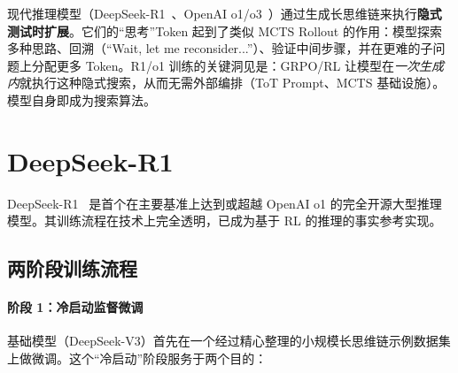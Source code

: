 \begin{intuitionbox}[推理模型中的隐式测试时扩展]
现代推理模型（DeepSeek-R1~\cite{deepseek2025r1}、OpenAI o1/o3~\cite{openai2024o1, openai2025o3}）通过生成长思维链来执行\textbf{隐式测试时扩展}。它们的“思考”Token 起到了类似 MCTS Rollout 的作用：模型探索多种思路、回溯（“Wait, let me reconsider...”）、验证中间步骤，并在更难的子问题上分配更多 Token。R1/o1 训练的关键洞见是：GRPO/RL 让模型在\emph{一次生成内}就执行这种隐式搜索，从而无需外部编排（ToT Prompt、MCTS 基础设施）。模型自身即成为搜索算法。
\end{intuitionbox}

\section{DeepSeek-R1}
\label{subsec:deepseek_r1}

DeepSeek-R1~\cite{deepseek2025r1} 是首个在主要基准上达到或超越 OpenAI o1 的完全开源大型推理模型。其训练流程在技术上完全透明，已成为基于 RL 的推理的事实参考实现。

\subsection{两阶段训练流程}
\label{two-stage-training-pipeline}

\paragraph{阶段 1：冷启动监督微调}
\label{stage-1-cold-start-supervised-fine-tuning}

基础模型（DeepSeek-V3）首先在一个经过精心整理的小规模长思维链示例数据集上做微调。这个“冷启动”阶段服务于两个目的：

